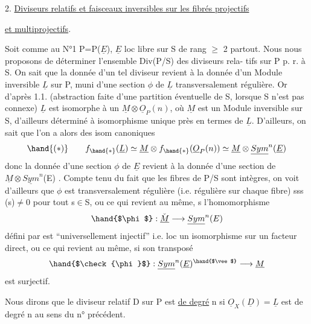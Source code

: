 
2. \uline{Diviseurs relatifs et faisceaux inversibles sur les fibrés projectifs}

\uline{et multiprojectifs}.

 Soit comme au N°1 P=P($\underline{E}$), $\underline{E}$ loc libre sur S de rang $\geqslant$ 2 partout.
Nous nous proposons de déterminer l'ensemble Div(P/S) des diviseurs rela-%
tifs  sur P p. r. à S. On sait que la donnée d'un tel diviseur revient à la
donnée d'un Module inversible $\underline{L}$ sur P, muni d'une section $\phi$ de $\underline{L}$
transversalement régulière. Or d'après 1.1. (abstraction faite d'une
partition éventuelle de S, lorsque S n'est pas connexe) $\underline{L}$ est isomorphe
à un $\underline{M}\otimes\underline{O}_P(n)$, où $\underline{M}$ est un Module inversible sur S, d'ailleurs déterminé
à isomorphisme unique près en termes de $\underline{L}$. D'ailleurs, on sait que
l'on a alors des isom canoniques
\[ \hand{(*)} \qquad f_{\hand{*}}(\underline{L}) \simeq \underline{M}\otimes f_{\hand{*}}(\underline{O}_P(n)) \simeq \underline{M}\otimes\underline{Sym}^n(\underline{E}) \]
donc la donnée d'une section  $\phi$ de $\underline{E}$ revient à la donnée d'une section
\inserted{$\phi$} de $\underline{M}\otimes\underline{Sym}^n$(E) . Compte tenu du fait que les fibres de P/S sont intègres,
on voit d'ailleurs que $\phi$ est transversalement régulière (i.e. régulière
sur chaque fibre) sss \hand{$\phi$}(s)$\neq$0 pour tout s$\in$S, ou ce qui revient au même,
s l'homomorphisme
\[ \hand{$\phi$} : \check{\underline{M}} \longrightarrow \underline{Sym}^n(E) \]
défini par \hand{$\phi$} est ``universellement injectif'' i.e. loc un isomorphisme sur
un facteur direct, ou ce qui revient au même, si son transposé
\[ \hand{$\check{\phi}$} : \underline{Sym}^n(\underline{E})^{\hand{$\vee$}} \longrightarrow \underline{M} \]
est surjectif.

Nous dirons que le diviseur relatif D sur P est \uline{de degré} n
si $\underline{O}_X(\underline{D})= \underline{L}$ est de degré n au sens du n° précédent. 

